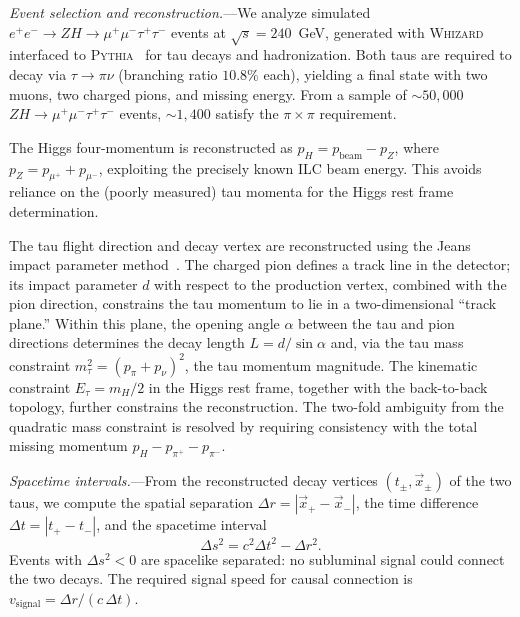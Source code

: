 \documentclass[prl,twocolumn,superscriptaddress,floatfix]{revtex4-2}
\newcommand{\ee}{e^+e^-}
\newcommand{\tautau}{\tau^+\tau^-}
\newcommand{\mumu}{\mu^+\mu^-}
\newcommand{\vsig}{v_{\mathrm{signal}}}
\newcommand{\sqrts}{\sqrt{s}}
\begin{document}

\textit{Event selection and reconstruction.}---We analyze simulated
$\ee\to ZH\to\mumu\tautau$ events at $\sqrts=240$~GeV, generated
with \textsc{Whizard}~\cite{Whizard} interfaced to
\textsc{Pythia}~\cite{Pythia8} for tau decays and hadronization.
Both taus are required to decay via $\tau\to\pi\nu$ (branching
ratio $10.8\%$ each), yielding a final state with two muons, two
charged pions, and missing energy.  From a sample of ${\sim}50{,}000$
$ZH\!\to\!\mumu\tautau$ events, ${\sim}1{,}400$ satisfy the
$\pi\!\times\!\pi$ requirement.

The Higgs four-momentum is reconstructed as $p_H = p_{\mathrm{beam}} - p_Z$,
where $p_Z = p_{\mu^+} + p_{\mu^-}$, exploiting the precisely known
ILC beam energy.  This avoids reliance on the (poorly measured)
tau momenta for the Higgs rest frame determination.

The tau flight direction and decay vertex are reconstructed using
the Jeans impact parameter method~\cite{Jeans2015}.  The charged pion
defines a track line in the detector; its impact parameter $d$ with
respect to the production vertex, combined with the pion direction,
constrains the tau momentum to lie in a two-dimensional ``track plane.''
Within this plane, the opening angle $\alpha$ between the tau and pion
directions determines the decay length $L=d/\!\sin\alpha$ and, via the
tau mass constraint $m_\tau^2 = (p_\pi+p_\nu)^2$, the tau momentum
magnitude.  The kinematic constraint $E_\tau = m_H/2$ in the Higgs rest
frame, together with the back-to-back topology, further constrains the
reconstruction.  The two-fold ambiguity from the quadratic mass
constraint is resolved by requiring consistency with the total missing
momentum $p_H - p_{\pi^+} - p_{\pi^-}$.

\textit{Spacetime intervals.}---From the reconstructed decay vertices
$(t_\pm, \vec{x}_\pm)$ of the two taus, we compute the spatial
separation $\Delta r = |\vec{x}_+ - \vec{x}_-|$, the time difference
$\Delta t = |t_+ - t_-|$, and the spacetime interval
\begin{equation}
  \Delta s^2 = c^2\Delta t^2 - \Delta r^2.
  \label{eq:ds2}
\end{equation}
Events with $\Delta s^2<0$ are spacelike separated: no subluminal
signal could connect the two decays.  The required signal speed for
causal connection is $\vsig = \Delta r/(c\,\Delta t)$.
\end{document}
